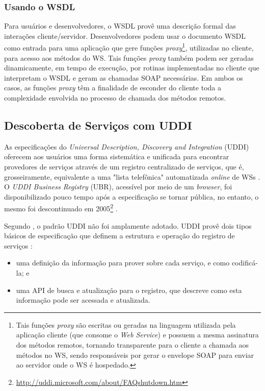 \subsubsection{Usando o WSDL}

Para usuários e desenvolvedores, o WSDL provê uma descrição formal das interações cliente/servidor.
Desenvolvedores podem usar o documento WSDL como entrada para uma aplicação que gere 
funções \textit{proxy}\footnote{Tais funções \textit{proxy} são escritas ou geradas
na linguagem utilizada pela aplicação cliente (que consome o \textit{Web Service}) e possuem
a mesma assinatura dos métodos remotos, tornando transparente para o cliente a chamada
aos métodos no WS, sendo responsáveis por gerar o envelope SOAP para enviar ao
servidor onde o WS é hospedado.},
utilizadas no cliente, para acesso aos métodos do WS. Tais funções \textit{proxy}
também podem ser geradas dinamicamente, em tempo de execução, por rotinas implementadas
no cliente que interpretam o WSDL e geram as chamadas SOAP necessárias.
Em ambos os casos, as funções \textit{proxy} têm a finalidade de esconder do cliente toda a complexidade
envolvida no processo de chamada dos métodos remotos.

\subsection{Descoberta de Serviços com UDDI} \label{sec:uddi}

As especificações do \textit{Universal Description, Discovery and Integration} (UDDI) oferecem aos usuários uma forma sistemática e unificada para encontrar provedores
de serviços através de um registro centralizado de serviços, que é, grosseiramente,
equivalente a uma "lista telefônica"  automatizada \textit{online} de WSs \cite{curbera2002unraveling}.
O \textit{UDDI Business Registry} (UBR), acessível por meio de um \textit{browser}, foi
disponibilizado pouco tempo após a especificação se tornar pública, no entanto, o mesmo foi descontinuado
em 2005\footnote{\url{http://uddi.microsoft.com/about/FAQshutdown.htm}} \cite{treiber2007active}.

Segundo \cite{sommerville2011soft}, o padrão UDDI não foi amplamente adotado.
UDDI provê dois tipos básicos de especificação que definem a estrutura
e operação do registro de serviços \cite{curbera2002unraveling}:

\begin{itemize}
	\item uma definição da informação para prover sobre cada serviço, e como codificá-la; e
  \item uma API de busca e atualização para o registro, que descreve como esta informação
  pode ser acessada e atualizada.
\end{itemize}

